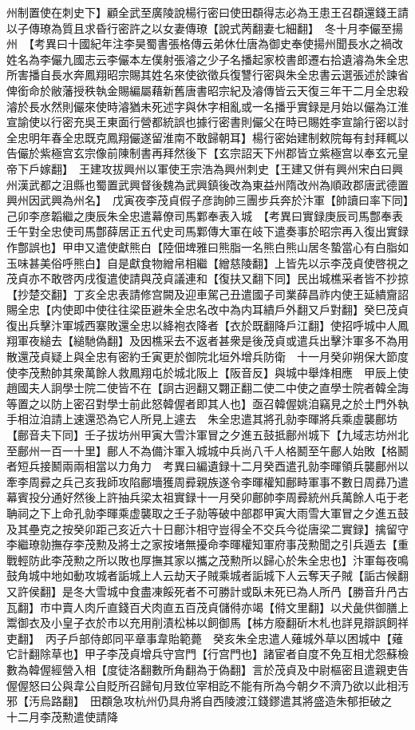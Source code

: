 州制置使在刺史下】顧全武至廣陵說楊行密曰使田頵得志必為王患王召頵還錢王請以子傳璙為質且求昏行密許之以女妻傳璙【說式苪翻妻七細翻】　冬十月李儼至揚州　【考異曰十國紀年注李昊蜀書張格傳云弟休仕唐為御史奉使揚州聞長水之禍改姓名為李儼九國志云李儼本左僕射張濬之少子名播起家校書郎遷右拾遺濬為朱全忠所害播自長水奔鳳翔昭宗賜其姓名來使欲徵兵復讐行密與朱全忠書云選張述於諫省俾銜命於敝藩授秩執金賜編屬藉新舊唐書昭宗紀及濬傳皆云天復三年干二月全忠殺濬於長水然則儼來使時濬猶未死述字與休字相亂或一名播乎實録是月始以儼為江淮宣諭使以行密充吳王東面行營都統誤也據行密書則儼父在時已賜姓李宣諭行密以討全忠明年春全忠既克鳳翔儼遂留淮南不敢歸朝耳】楊行密始建制敕院每有封拜輒以告儼於紫極宫玄宗像前陳制書再拜然後下【玄宗詔天下州郡皆立紫極宫以奉玄元皇帝下戶嫁翻】　王建攻拔興州以軍使王宗浩為興州刺史【王建又併有興州宋白曰興州漢武都之沮縣也蜀置武興督後魏為武興鎮後改為東益州隋改州為順政郡唐武德置興州因武興為州名】　戊寅夜李茂貞假子彦詢帥三團步兵奔於汴軍【帥讀曰率下同】己卯李彦韜繼之庚辰朱全忠遣幕僚司馬鄴奉表入城　【考異曰實録庚辰司馬鄷奉表壬午對全忠使司馬鄷薛居正五代史司馬鄴傳大軍在岐下遣奏事於昭宗再入復出實録作鄷誤也】甲申又遣使獻熊白【陸佃埤雅曰熊脂一名熊白熊山居冬蟄當心有白脂如玉味甚美俗呼熊白】自是獻食物繒帛相繼【繒慈陵翻】上皆先以示李茂貞使啓視之茂貞亦不敢啓丙戌復遣使請與茂貞議連和【復扶又翻下同】民出城樵采者皆不抄掠【抄楚交翻】丁亥全忠表請修宫闕及迎車駕己丑遣國子司業薛昌祚内使王延繢齎詔賜全忠【内使即中使往往梁臣避朱全忠名改中為内耳繢戶外翻又戶對翻】癸巳茂貞復出兵擊汴軍城西寨敗還全忠以絳袍衣降者【衣於既翻降戶江翻】使招呼城中人鳳翔軍夜縋去【縋馳偽翻】及因樵采去不返者甚衆是後茂貞或遣兵出擊汴軍多不為用散還茂貞疑上與全忠有密約壬寅更於御院北垣外增兵防衛　十一月癸卯朔保大節度使李茂勲帥其衆萬餘人救鳳翔屯於城北阪上【阪音反】與城中舉烽相應　甲辰上使趙國夫人詗學士院二使皆不在【詗古迥翻又翾正翻二使二中使之直學士院者韓全誨等置之以防上密召對學士前此怒韓偓者即其人也】亟召韓偓姚洎竊見之於土門外執手相泣洎請上速還恐為它人所見上遽去　朱全忠遣其將孔勍李暉將兵乘虛襲鄜坊【鄜音夫下同】壬子拔坊州甲寅大雪汴軍冒之夕進五鼓抵鄜州城下【九域志坊州北至鄜州一百一十里】鄜人不為備汴軍入城城中兵尚八千人格鬭至午鄜人始敗【格鬭者短兵接鬭兩兩相當以力角力　考異曰編遺録十二月癸酉遣孔勍李暉領兵襲鄜州以牽李周彛之兵己亥我師攻陷鄜墻獲周彛親族遂令李暉權知鄜畤軍事不數日周彞乃遣幕賓投分通好然後上許抽兵梁太祖實録十一月癸卯鄜帥李周彛統州兵萬餘人屯于老聃祠之下上命孔勍李暉乘虚襲取之壬子勍等破中部郡甲寅大雨雪大軍冒之夕進五鼓及其壘克之按癸卯距己亥近六十日鄜汴相守豈得全不交兵今從唐梁二實録】擒留守李繼璙勍撫存李茂勲及將士之家按堵無擾命李暉權知軍府事茂勲聞之引兵遁去【重戰輕防此李茂勲之所以敗也厚撫其家以攜之茂勲所以歸心於朱全忠也】汴軍每夜鳴鼓角城中地如動攻城者詬城上人云劫天子賊乘城者詬城下人云奪天子賊【詬古候翻又許侯翻】是冬大雪城中食盡凍餒死者不可勝計或臥未死已為人所冎【勝音升冎古瓦翻】市中賣人肉斤直錢百犬肉直五百茂貞儲偫亦竭【偫文里翻】以犬彘供御膳上鬻御衣及小皇子衣於市以充用削漬松柹以飼御馬【柹方廢翻斫木札也詳見辯誤飼祥吏翻】　丙子戶部侍郎同平章事韋貽範薨　癸亥朱全忠遣人薙城外草以困城中【薙它計翻除草也】甲子李茂貞增兵守宫門【行宫門也】諸宦者自度不免互相尤怨蘇檢數為韓偓經營入相【度徒洛翻數所角翻為于偽翻】言於茂貞及中尉樞密且遣親吏告偓偓怒曰公與韋公自貶所召歸旬月致位宰相訖不能有所為今朝夕不濟乃欲以此相汚邪【汚烏路翻】　田頵急攻杭州仍具舟將自西陵渡江錢鏐遣其將盛造朱郁拒破之　十二月李茂勲遣使請降